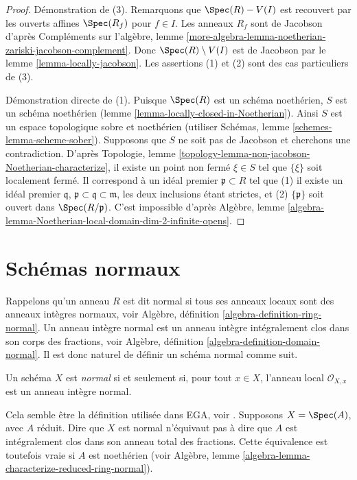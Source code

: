 \begin{proof}
Démonstration de (3). Remarquons que $\Spec(R) - V(I)$ est recouvert par les
ouverts affines $\Spec(R_f)$ pour $f \in I$. Les anneaux $R_f$ sont de Jacobson d'après
Compléments sur l'algèbre, lemme
\ref{more-algebra-lemma-noetherian-zariski-jacobson-complement}.
Donc $\Spec(R) \setminus V(I)$ est de Jacobson par le
lemme \ref{lemma-locally-jacobson}.
Les assertions (1) et (2) sont des cas particuliers de (3).

\medskip\noindent
Démonstration directe de (1).
Puisque $\Spec(R)$ est un schéma noethérien,
$S$ est un schéma noethérien (lemme \ref{lemma-locally-closed-in-Noetherian}).
Ainsi $S$ est un espace topologique sobre et noethérien (utiliser
Schémas, lemme \ref{schemes-lemma-scheme-sober}).
Supposons que $S$ ne soit pas de Jacobson et cherchons
une contradiction. D'après
Topologie, lemme \ref{topology-lemma-non-jacobson-Noetherian-characterize},
il existe un point non fermé $\xi \in S$
tel que $\{\xi\}$ soit localement fermé. Il correspond
à un idéal premier $\mathfrak p \subset R$ tel que (1) il existe
un idéal premier $\mathfrak q$, $\mathfrak p \subset \mathfrak q \subset \mathfrak m$,
les deux inclusions étant strictes, et (2) $\{\mathfrak p\}$ soit ouvert dans
$\Spec(R/\mathfrak p)$. C'est impossible d'après Algèbre,
lemme \ref{algebra-lemma-Noetherian-local-domain-dim-2-infinite-opens}.
\end{proof}

\section{Schémas normaux}
\label{section-normal}

\noindent
Rappelons qu'un anneau $R$ est dit normal si tous ses anneaux locaux
sont des anneaux intègres normaux,
voir Algèbre, définition \ref{algebra-definition-ring-normal}.
Un anneau intègre normal est un anneau intègre intégralement clos dans son corps
des fractions, voir
Algèbre, définition \ref{algebra-definition-domain-normal}.
Il est donc naturel de définir un schéma normal comme suit.

\begin{definition}
\label{definition-normal}
Un schéma $X$ est {\it normal} si et seulement si, pour tout $x \in X$, l'anneau local
$\mathcal{O}_{X, x}$ est un anneau intègre normal.
\end{definition}

\noindent
Cela semble être la définition utilisée dans EGA, voir \cite[0, 4.1.4]{EGA}.
Supposons $X = \Spec(A)$, avec $A$ réduit. Dire que $X$ est
normal n'équivaut pas à dire que $A$ est intégralement clos dans son
anneau total des fractions. Cette équivalence est toutefois vraie si $A$ est noethérien
(voir Algèbre, lemme \ref{algebra-lemma-characterize-reduced-ring-normal}).


